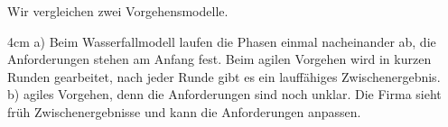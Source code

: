 \question[4]
Wir vergleichen zwei Vorgehensmodelle.
\begin{solutionbox}{4cm}
a) Beim Wasserfallmodell laufen die Phasen einmal nacheinander ab, die Anforderungen stehen am Anfang fest. Beim agilen Vorgehen wird in kurzen Runden gearbeitet, nach jeder Runde gibt es ein lauffähiges Zwischenergebnis. \\
b) agiles Vorgehen, denn die Anforderungen sind noch unklar. Die Firma sieht früh Zwischenergebnisse und kann die Anforderungen anpassen.
\end{solutionbox}
